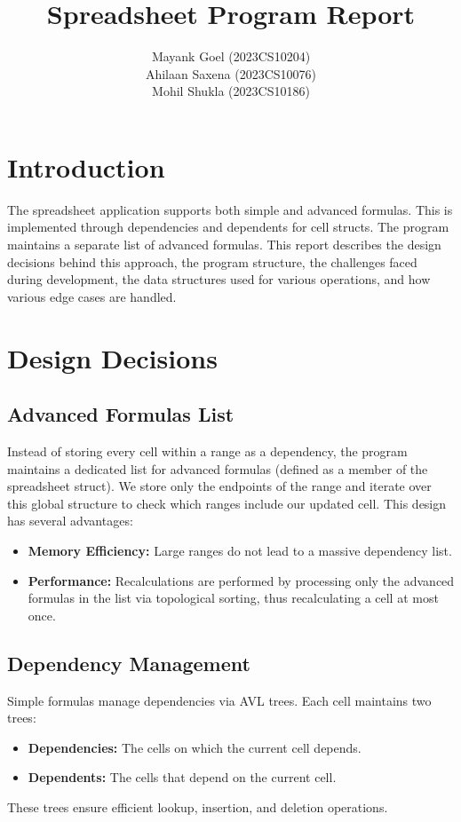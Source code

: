 \documentclass[12pt]{article}
\title{Spreadsheet Program Report}
\author{
Mayank Goel (2023CS10204) \\
Ahilaan Saxena (2023CS10076) \\
Mohil Shukla (2023CS10186)
}
\begin{document}
\maketitle

\section{Introduction}
The spreadsheet application supports both simple and advanced formulas. This is implemented through dependencies and dependents for cell structs. The program maintains a separate list of advanced formulas. This report describes the design decisions behind this approach, the program structure, the challenges faced during development, the data structures used for various operations, and how various edge cases are handled.

\section{Design Decisions}
\subsection{Advanced Formulas List}
Instead of storing every cell within a range as a dependency, the program maintains a dedicated list for advanced formulas (defined as a member of the spreadsheet struct). We store only the endpoints of the range and iterate over this global structure to check which ranges include our updated cell. This design has several advantages:
\begin{itemize}[noitemsep]
    \item \textbf{Memory Efficiency:} Large ranges do not lead to a massive dependency list.
    \item \textbf{Performance:} Recalculations are performed by processing only the advanced formulas in the list via topological sorting, thus recalculating a cell at most once.
\end{itemize}

\subsection{Dependency Management}
Simple formulas manage dependencies via AVL trees. Each cell maintains two trees:
\begin{itemize}[noitemsep]
    \item \textbf{Dependencies:} The cells on which the current cell depends.
    \item \textbf{Dependents:} The cells that depend on the current cell.
\end{itemize}
These trees ensure efficient lookup, insertion, and deletion operations.
\end{document}
